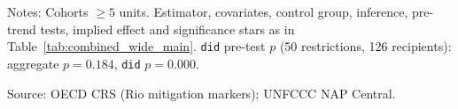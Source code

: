 \begin{table}[H]
\centering
\caption{Falsification test: effect of NAP adoption on log(mitigation commitments)}
\label{tab:mitigation}
\begingroup\small
{}
\endgroup
\par\vspace{4pt}
\begin{minipage}{\linewidth}\footnotesize
Notes: Cohorts $\geq 5$ units. Estimator, covariates, control group, inference, pre-trend tests, implied effect and significance stars as in Table~\ref{tab:combined_wide_main}. \texttt{did} pre-test $p$ (50 restrictions, 126 recipients): aggregate $p = 0.184$, \texttt{did} $p = 0.000$.\par
Source: OECD CRS (Rio mitigation markers); UNFCCC NAP Central.
\end{minipage}
\end{table}
